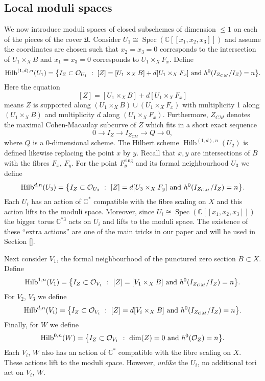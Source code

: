 \documentclass{amsart}
\theoremstyle{definition}
\newcommand{\CC} {\mathbb{C}}          %
\renewcommand{\O}{\mathcal{O}}
\newcommand{\Hilb}{\operatorname{Hilb}}
\newcommand{\Spec}{\operatorname{Spec}}
\newcommand{\sing}{\operatorname{sing}}
\begin{document}
\subsection{Local moduli spaces} \label{localmod}

We now introduce moduli spaces of closed subschemes of dimension $\leq 1$ on each of the pieces of the cover $\mathfrak{U}$. Consider $U_1 \cong \Spec(\CC[\![ x_1,x_2,x_3]\!])$ and assume the coordinates are chosen such that $x_2=x_3=0$ corresponds to the intersection of $U_1 \times_X B$ and $x_1=x_3=0$ corresponds to $U_1 \times_X F_x$. Define
$$
\Hilb^{(1,d),n}(U_1) = \big\{ I_Z \subset \O_{U_1} \ : \ [Z] = [U_1 \times_X B] + d [U_1 \times_X F_x] \ {\rm{and}} \ h^0(I_{Z_{CM}} / I_Z) = n \big\}.
$$
Here the equation
$$
[Z] = [U_1 \times_X B] + d [U_1 \times_X F_x]
$$
means $Z$ is supported along $(U_1 \times_X B) \cup (U_1 \times_X F_x)$ with multiplicity 1 along $(U_1 \times_X B)$ and multiplicity $d$ along $(U_1 \times_X F_x)$. Furthermore, $Z_{CM}$ denotes the maximal Cohen-Macaulay subcurve of $Z$ which fits in a short exact sequence
$$
0 \longrightarrow I_{Z} \longrightarrow I_{Z_{CM}} \longrightarrow Q \longrightarrow 0, 
$$
where $Q$ is a 0-dimensional scheme. The Hilbert scheme $\Hilb^{(1,d),n}(U_2)$ is defined likewise replacing the point $x$ by $y$. Recall that $x,y$ are intersections of $B$ with the fibres $F_x$, $F_y$. For the point $F_{y}^{\sing}$ and its formal neighbourhood $U_3$ we define
$$
\Hilb^{d,n}(U_3) = \big\{ I_Z \subset \O_{U_3} \ : \ [Z] = d [U_3 \times_X F_y] \ {\rm{and}} \ h^0(I_{Z_{CM}} / I_Z) = n \big\}.
$$
Each $U_i$ has an action of $\CC^*$ compatible with the fibre scaling on $X$ and this action lifts to the moduli space. Moreover, since $U_i \cong \Spec(\CC[\![x_1,x_2,x_3]\!])$ the bigger torus $\CC^{*3}$ acts on $U_i$ and lifts to the moduli space. The existence of these ``extra actions'' are one of the main tricks in our paper and will be used in Section \ref{}.

Next consider $V_1$, the formal neighbourhood of the punctured zero section $B \subset X$. Define
$$
\Hilb^{1,n}(V_1) = \big\{ I_Z \subset \O_{V_1} \ : \ [Z] = [V_1 \times_X B] \ {\rm{and}} \ h^0(I_{Z_{CM}} / I_Z) = n \big\}.
$$
For $V_2$, $V_3$ we define
$$
\Hilb^{d,n}(V_i) = \big\{ I_Z \subset \O_{V_i} \ : \ [Z] = d [V_i \times_X B] \ {\rm{and}} \ h^0(I_{Z_{CM}} / I_Z) = n \big\}.
$$
Finally, for $W$ we define
$$
\Hilb^{0,n}(W) = \big\{ I_Z \subset \O_{V_1} \ : \ \dim(Z) = 0 \ {\rm{and}} \ h^0(\O_Z) = n \big\}.
$$
Each $V_i$, $W$ also has an action of $\CC^*$ compatible with the fibre scaling on $X$. These actions lift to the moduli space. However, \emph{unlike} the $U_i$, no additional tori act on $V_i$, $W$.
\end{document}
